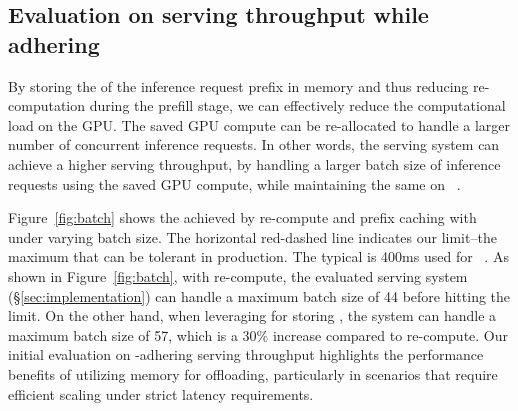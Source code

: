 \subsection{Evaluation on serving throughput while adhering \slo}
\label{sec:eval:throughput}

By storing the \kvcache of the inference request prefix in \cxl memory and thus reducing re-computation during the prefill stage, we can effectively reduce the computational load on the GPU.
The saved GPU compute can be re-allocated to handle a larger number of concurrent inference requests. 
In other words, the \llm serving system can achieve a higher serving throughput, by handling a larger batch size of inference requests using the saved GPU compute, while maintaining the same \slo on \ttft~\cite{distserve}.

Figure~\ref{fig:batch} shows the \ttft achieved by \kv re-compute and prefix caching with \cxl under varying batch size.
The horizontal red-dashed line indicates our \slo limit--the maximum \ttft that can be tolerant in production.
The typical \slo is 400ms used for ~\cite{ttft}.
As shown in Figure~\ref{fig:batch}, with \kv re-compute, the evaluated serving system (\S\ref{sec:implementation}) can handle a maximum batch size of 44 before hitting the \slo limit.
On the other hand, when leveraging \cxl for storing \kvcache, the system can handle a maximum batch size of 57, which is a 30\% increase compared to \kv re-compute. 
Our initial evaluation on \slo-adhering serving throughput highlights the performance benefits of utilizing \cxl memory for \kvcache offloading, particularly in scenarios that require efficient scaling under strict latency requirements.






